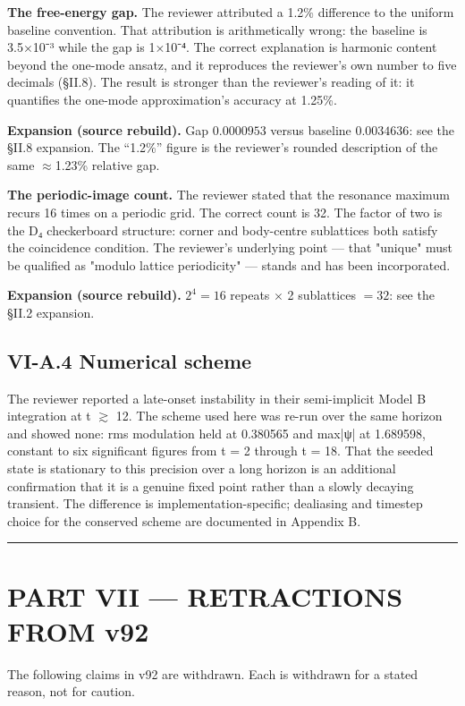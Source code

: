 \documentclass[a4paper,11pt]{article}
\newcommand{\expansion}[1]{\par\smallskip\noindent\textbf{Expansion (source rebuild).} #1\par\smallskip}
\begin{document}
\textbf{The free-energy gap.} The reviewer attributed a 1.2\% difference to the uniform baseline convention. That attribution is arithmetically wrong: the baseline is 3.5×10⁻³ while the gap is 1×10⁻⁴. The correct explanation is harmonic content beyond the one-mode ansatz, and it reproduces the reviewer's own number to five decimals (§II.8). The result is stronger than the reviewer's reading of it: it quantifies the one-mode approximation's accuracy at 1.25\%.


\expansion{Gap $0.0000953$ versus baseline $0.0034636$: see the \S II.8 expansion. The ``1.2\%'' figure is the reviewer's rounded description of the same $\approx$1.23\% relative gap.}
\textbf{The periodic-image count.} The reviewer stated that the resonance maximum recurs 16 times on a periodic grid. The correct count is 32. The factor of two is the D₄ checkerboard structure: corner and body-centre sublattices both satisfy the coincidence condition. The reviewer's underlying point — that "unique" must be qualified as "modulo lattice periodicity" — stands and has been incorporated.


\expansion{$2^4 = 16$ repeats $\times$ 2 sublattices $= 32$: see the \S II.2 expansion.}
\subsection*{VI-A.4 Numerical scheme}

The reviewer reported a late-onset instability in their semi-implicit Model B integration at t $\gtrsim$ 12. The scheme used here was re-run over the same horizon and showed none: rms modulation held at 0.380565 and max|ψ| at 1.689598, constant to six significant figures from t = 2 through t = 18. That the seeded state is stationary to this precision over a long horizon is an additional confirmation that it is a genuine fixed point rather than a slowly decaying transient. The difference is implementation-specific; dealiasing and timestep choice for the conserved scheme are documented in Appendix B.

\medskip\hrule\medskip

\section*{PART VII — RETRACTIONS FROM v92}

The following claims in v92 are withdrawn. Each is withdrawn for a stated reason, not for caution.
\end{document}
